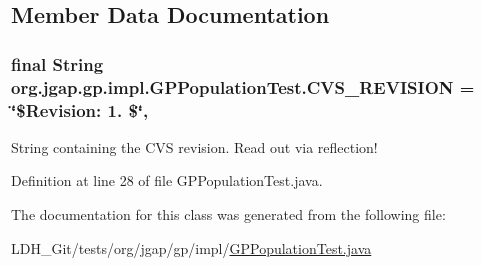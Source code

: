 \subsection{Member Data Documentation}
\hypertarget{classorg_1_1jgap_1_1gp_1_1impl_1_1_g_p_population_test_a59a2d0f26373c7db9d2d42ce9cd747af}{
\subsubsection[{C\-V\-S\-\_\-\-R\-E\-V\-I\-S\-I\-O\-N}]{\setlength{\rightskip}{0pt plus 5cm}final String org.\-jgap.\-gp.\-impl.\-G\-P\-Population\-Test.\-C\-V\-S\-\_\-\-R\-E\-V\-I\-S\-I\-O\-N = \char`\"{}\$Revision\-: 1. \$\char`\"{}\hspace{0.3cm}{\ttfamily [static]}, {\ttfamily [private]}}}\label{classorg_1_1jgap_1_1gp_1_1impl_1_1_g_p_population_test_a59a2d0f26373c7db9d2d42ce9cd747af}
String containing the C\-V\-S revision. Read out via reflection! 

Definition at line 28 of file G\-P\-Population\-Test.\-java.



The documentation for this class was generated from the following file\-:\begin{DoxyCompactItemize}
\item 
L\-D\-H\-\_\-\-Git/tests/org/jgap/gp/impl/\hyperlink{_g_p_population_test_8java}{G\-P\-Population\-Test.\-java}\end{DoxyCompactItemize}
